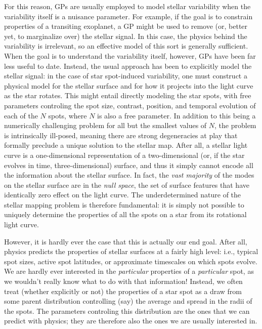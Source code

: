 \documentclass[modern]{aastex62}
\begin{document}
For this reason, GPs are usually employed to model stellar variability
when the variability itself is a nuisance parameter. For example, if the
goal is to constrain properties of a transiting exoplanet, a GP might be
used to remove (or, better yet, to marginalize over) the stellar signal.
In this case, the physics behind the variability is irrelevant, so an
effective model of this sort is generally sufficient. When the goal is to understand
the variability itself, however, GPs have been far less useful to date. Instead,
the usual approach has been to explicitly model the stellar signal: in the
case of star spot-induced variability, one must construct a physical model
for the stellar surface and for how it projects into the light curve as the
star rotates. This might entail directly modeling the star spots,
with free parameters controling the spot size, contrast, position,
and temporal evolution of each of the $N$ spots, where $N$ is also
a free parameter. In addition to this being a numerically challenging
problem for all but the smallest values of $N$, the problem is
intrinsically ill-posed, meaning there are strong degeneracies at play
that formally preclude a unique solution to the stellar map.
After all, a stellar light curve is a one-dimensional representation of a
two-dimensional (or, if the star evolves in time, three-dimensional)
surface, and thus it simply cannot encode all the information about the stellar surface.
In fact, the \emph{vast majority} of the modes on the stellar surface
are in the \emph{null space}, the set of surface features that have identically
zero effect on the light curve.
The underdetermined nature of the stellar mapping problem is therefore fundamental: it
is simply not possible to uniquely determine the properties of all the spots on
a star from its rotational light curve.

However, it is hardly ever the case that this is actually our end goal.
After all, physics predicts the properties of stellar surfaces at a fairly
high level: i.e., typical spot sizes, active spot latitudes, or approximate
timescales on which spots evolve. We are hardly ever interested in the
\emph{particular} properties of a \emph{particular} spot, as we wouldn't really
know what to do with that information! Instead, we often treat
(whether explicitly or not)
the properties of a star spot as a draw from some parent distribution
controlling (say) the average and spread in the radii of the spots.
The parameters controling this distribution are the ones that we can
predict with physics; they are therefore also the ones we are usually
interested in.
\end{document}
